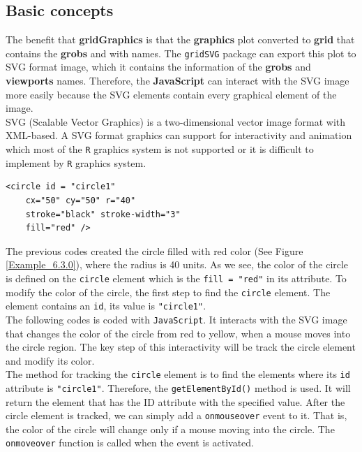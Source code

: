 \documentclass[11pt]{report}
\begin{document}
\subsection{Basic concepts}
The benefit that \textbf{gridGraphics} is that the \textbf{graphics} plot converted to \textbf{grid} that contains the \textbf{grobs} and  with names. The \texttt{gridSVG} \citep{gridSVG} package can export this plot to SVG format image, which it contains the information of the \textbf{grobs} and \textbf{viewports} names. Therefore, the \textbf{JavaScript} \citep{javascript} can interact with the SVG image more easily because the SVG elements contain every graphical element of the image.\\

SVG (Scalable Vector Graphics) \citep{SVG} is a two-dimensional vector image format with XML-based. A SVG format graphics can support for interactivity and animation which most of the \texttt{R} graphics system is not supported or it is difficult to implement by \texttt{R} graphics system.\\

\begin{lstlisting}
<circle id = "circle1" 
    cx="50" cy="50" r="40" 
    stroke="black" stroke-width="3" 
    fill="red" />
\end{lstlisting}

The previous codes created the circle filled with red color (See Figure \ref{Example_6.3.0}), where the radius is 40 units. As we see, the color of the circle is defined on the \texttt{circle} element which is the \texttt{fill = "red"} in its attribute. To modify the color of the circle, the first step to find the \texttt{circle} element. The element contains an \texttt{id}, its value is \texttt{"circle1"}.\\

The following codes is coded with \texttt{JavaScript}. It interacts with the SVG image that changes the color of the circle from red to yellow, when a mouse moves into the circle region. The key step of this interactivity will be track the circle element and modify its color.\\

The method for tracking the \texttt{circle} element is to find the elements where its \texttt{id} attribute is \texttt{"circle1"}. Therefore, the \texttt{getElementById()} method is used. It will return the element that has the ID attribute with the specified value. After the circle element is tracked, we can simply add a \texttt{onmouseover} event to it. That is, the color of the circle will change only if a mouse moving into the circle. The \texttt{onmoveover} function is called when the event is activated.\\ 
\end{document}
